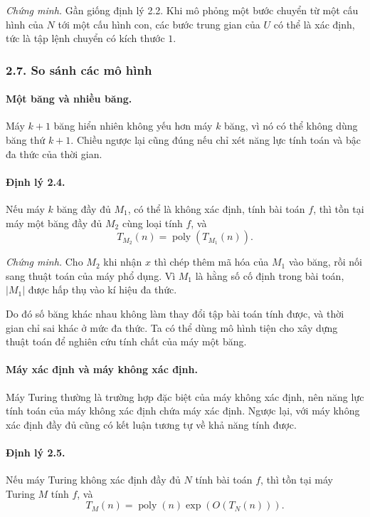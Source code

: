\documentclass[11pt]{article}
\begin{document}
\emph{Chứng minh.}
Gần giống định lý 2.2. Khi mô phỏng một bước chuyển từ một cấu hình của \(N\)
tới một cấu hình con, các bước trung gian của \(U\) có thể là xác định, tức là
tập lệnh chuyển có kích thước \(1\).

\subsubsection*{2.7. So sánh các mô hình}

\paragraph{Một băng và nhiều băng.}
Máy \(k+1\) băng hiển nhiên không yếu hơn máy \(k\) băng, vì nó có thể không
dùng băng thứ \(k+1\). Chiều ngược lại cũng đúng nếu chỉ xét năng lực tính toán
và bậc đa thức của thời gian.

\paragraph{Định lý 2.4.}
Nếu máy \(k\) băng đầy đủ \(M_1\), có thể là không xác định, tính bài toán
\(f\), thì tồn tại máy một băng đầy đủ \(M_2\) cùng loại tính \(f\), và
\[
  T_{M_2}(n)=\operatorname{poly}(T_{M_1}(n)).
\]

\emph{Chứng minh.}
Cho \(M_2\) khi nhận \(x\) thì chép thêm mã hóa của \(M_1\) vào băng, rồi nối
sang thuật toán của máy phổ dụng. Vì \(M_1\) là hằng số cố định trong bài toán,
\(|M_1|\) được hấp thụ vào kí hiệu đa thức.

Do đó số băng khác nhau không làm thay đổi tập bài toán tính được, và thời gian
chỉ sai khác ở mức đa thức. Ta có thể dùng mô hình tiện cho xây dựng thuật toán
để nghiên cứu tính chất của máy một băng.

\paragraph{Máy xác định và máy không xác định.}
Máy Turing thường là trường hợp đặc biệt của máy không xác định, nên năng lực
tính toán của máy không xác định chứa máy xác định. Ngược lại, với máy không
xác định đầy đủ cũng có kết luận tương tự về khả năng tính được.

\paragraph{Định lý 2.5.}
Nếu máy Turing không xác định đầy đủ \(N\) tính bài toán \(f\), thì tồn tại máy
Turing \(M\) tính \(f\), và
\[
  T_M(n)=\operatorname{poly}(n)\exp(O(T_N(n))).
\]
\end{document}
